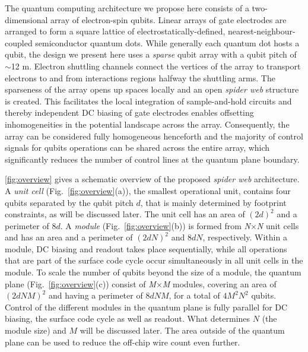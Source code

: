 \documentclass[aps,prl,reprint,superscriptaddress,floatfix]{revtex4-1}
\begin{document}
The quantum computing architecture we propose here consists of a two-dimensional array of electron-spin qubits.
Linear arrays of gate electrodes are arranged to form a square lattice of electrostatically-defined, nearest-neighbour-coupled semiconductor quantum dots.
While generally each quantum dot hosts a qubit, the design we present here uses a \textit{sparse} qubit array with a qubit pitch of $\sim$12 \textmu m.
Electron shuttling channels connect the vertices of the array to transport electrons to and from interactions regions halfway the shuttling arms.
The sparseness of the array opens up spaces locally and an open \textit{spider web} structure is created.
This facilitates the local integration of sample-and-hold circuits and thereby independent DC biasing of gate electrodes enables offsetting inhomogeneities in the potential landscape across the array.
Consequently, the array can be considered fully homogeneous henceforth and the majority of control signals for qubits operations can be shared across the entire array, which significantly reduces the number of control lines at the quantum plane boundary.

\autoref{fig:overview} gives a schematic overview of the proposed \textit{spider web} architecture.
A \textit{unit cell} (Fig.~\ref{fig:overview}(a)), the smallest operational unit, contains four qubits separated by the qubit pitch $d$, that is mainly determined by footprint constraints, as will be discussed later.
The unit cell has an area of $(2d)^2$ and a perimeter of $8d$.
A \textit{module} (Fig.~\ref{fig:overview}(b)) is formed from \textit{N$\times$N} unit cells and has an area and a perimeter of $(2dN)^2$ and $8dN$, respectively.
Within a module, DC biasing and readout takes place sequentially, while all operations that are part of the surface code cycle occur simultaneously in all unit cells in the module.
To scale the number of qubits beyond the size of a module, the quantum plane (Fig.~\ref{fig:overview}(c)) consist of \textit{M$\times$M} modules, covering an area of $(2dNM)^2$ and having a perimeter of $8dNM$, for a total of $4M^2N^2$ qubits.
Control of the different modules in the quantum plane is fully parallel for DC biasing, the surface code cycle as well as readout.
What determines $N$ (the module size) and $M$ will be discussed later.
The area outside of the quantum plane can be used to reduce the off-chip wire count even further.
\end{document}
